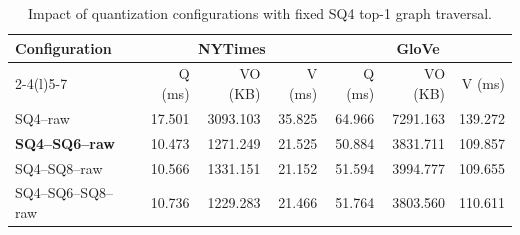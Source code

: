\begin{table}[!t]
\centering
\caption{Impact of quantization configurations with fixed SQ4 top-1 graph traversal.}
\label{tab:quantization_text}
\footnotesize
\setlength{\tabcolsep}{2.5pt}
\renewcommand{\arraystretch}{1.15}
\begin{tabular}{lrrrrrr}
\toprule
\multirow{2}{*}{Configuration}
& \multicolumn{3}{c}{\textsf{NYTimes}} & \multicolumn{3}{c}{\textsf{GloVe}} \\
\cmidrule(lr){2-4}\cmidrule(l){5-7}
& Q (ms) & VO (KB) & V (ms) & Q (ms) & VO (KB) & V (ms) \\
\midrule
SQ4--raw & 17.501 & 3093.103 & 35.825 & 64.966 & 7291.163 & 139.272 \\
\textbf{SQ4--SQ6--raw} & 10.473 & 1271.249 & 21.525 & 50.884 & 3831.711 & 109.857 \\
SQ4--SQ8--raw & 10.566 & 1331.151 & 21.152 & 51.594 & 3994.777 & 109.655 \\
SQ4--SQ6--SQ8--raw & 10.736 & 1229.283 & 21.466 & 51.764 & 3803.560 & 110.611 \\
\bottomrule
\end{tabular}
\end{table}
